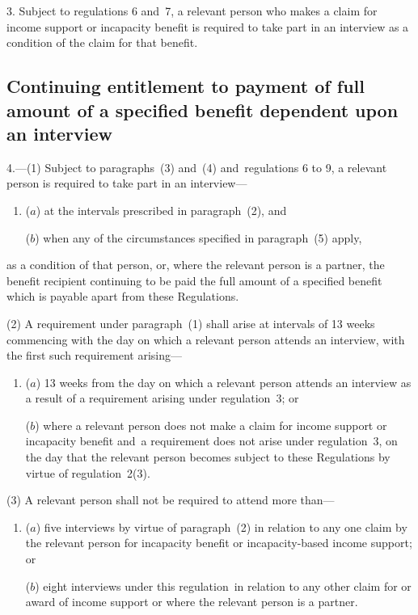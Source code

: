 \documentclass[12pt,a4paper]{article}
\begin{document}
3.  Subject to regulations 6 and~7, a relevant person who makes a claim for income support or incapacity benefit is required to take part in an interview as a condition of the claim for that benefit.

\subsection[4. Continuing entitlement to payment of full amount of a specified benefit dependent upon an interview]{Continuing entitlement to payment of full amount of a specified benefit dependent upon an interview}

4.---(1)  Subject to paragraphs~(3) and~(4) and~regulations 6 to 9, a relevant person is required to take part in an interview—
\begin{enumerate}\item[]
($a$) at the intervals prescribed in paragraph~(2), and

($b$) when any of the circumstances specified in paragraph~(5) apply,
\end{enumerate}
as a condition of that person, or, where the relevant person is a partner, the benefit recipient continuing to be paid the full amount of a specified benefit which is payable apart from these Regulations.

(2) A requirement under paragraph~(1) shall arise at intervals of 13 weeks commencing with the day on which a relevant person attends an interview, with the first such requirement arising—
\begin{enumerate}\item[]
($a$) 13 weeks from the day on which a relevant person attends an interview as a result of a requirement arising under regulation~3; or

($b$) where a relevant person does not make a claim for income support or incapacity benefit and~a requirement does not arise under regulation~3, on the day that the relevant person becomes subject to these Regulations by virtue of regulation~2(3).
\end{enumerate}

(3) A relevant person shall not be required to attend more than—
\begin{enumerate}\item[]
($a$) five interviews by virtue of paragraph~(2) in relation to any one claim by the relevant person for incapacity benefit or incapacity-based income support; or

($b$) eight interviews under this regulation~in relation to any other claim for or award of income support or where the relevant person is a partner.
\end{enumerate}
\end{document}
